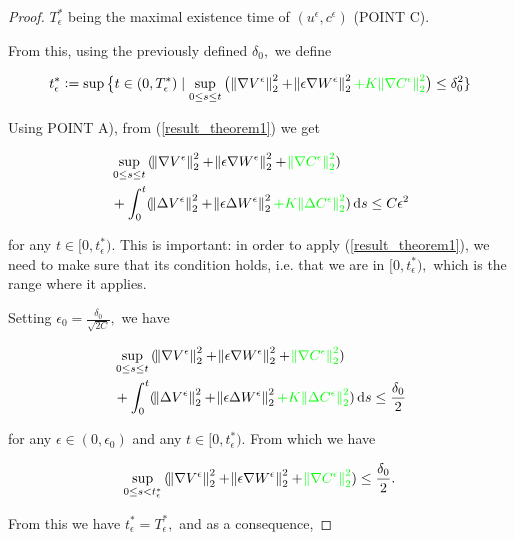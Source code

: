 \documentclass[11pt]{article}
\newcommand*\diff{\mathop{}\!\mathrm{d}}
\begin{document}
\begin{proof}
$T^*_\epsilon$ being the maximal existence time of $(u^\epsilon, c^\epsilon)$ (POINT C).

From this, using the previously defined $\delta_0,$ we define

$$t^*_\epsilon:= \sup{ \big \{ t \in (0, T^*_\epsilon) \mid \sup_{0 \leq s \leq t}{\big (\norm{\nabla V^\epsilon}^2_2 + \norm{\epsilon \nabla W^\epsilon}^2_2 \textcolor{green}{+ K \norm{\nabla C^\epsilon}^2_2} \big ) \leq \delta_0^2}\} }$$

Using POINT A), from (\ref{result_theorem1}) we get

\begin{equation}
  \begin{split}
    & \sup_{0 \leq s \leq t}{(\norm{\nabla V^\epsilon}^2_2 + \norm{\epsilon \nabla W^\epsilon}^2_2 + \textcolor{green}{\norm{\nabla C^\epsilon}^2_2}) } \\
    & + \int_0^t (\norm{\Delta V^\epsilon}^2_2 + \norm{\epsilon \Delta W^\epsilon}^2_2 \textcolor{green}{+ K \norm{\Delta C^\epsilon}^2_2}) \diff s \leq C \epsilon^2
  \end{split}
\end{equation}

for any $t \in [0, t^*_\epsilon).$ This is important: in order to apply (\ref{result_theorem1}), we need to make sure that its condition holds, i.e. that we are in $[0, t^*_\epsilon),$ which is the range where it applies.

Setting $\epsilon_0 = \frac{\delta_0}{\sqrt{2C}},$ we have

\begin{equation}
  \begin{split}
    & \sup_{0 \leq s \leq t}{(\norm{\nabla V^\epsilon}^2_2 + \norm{\epsilon \nabla W^\epsilon}^2_2 + \textcolor{green}{\norm{\nabla C^\epsilon}^2_2}) } \\
    & + \int_0^t (\norm{\Delta V^\epsilon}^2_2 + \norm{\epsilon \Delta W^\epsilon}^2_2 \textcolor{green}{+ K \norm{\Delta C^\epsilon}^2_2}) \diff s \leq \frac{\delta_0}{2}
  \end{split}
\end{equation}

for any $\epsilon \in (0, \epsilon_0)$ and any $t \in [0, t^*_\epsilon).$ From which we have

$$ \sup_{0 \leq s < t^*_\epsilon}{(\norm{\nabla V^\epsilon}^2_2 + \norm{\epsilon \nabla W^\epsilon}^2_2 + \textcolor{green}{\norm{\nabla C^\epsilon}^2_2}) } \leq \frac{\delta_0}{2}.$$

From this we have $t^*_\epsilon = T^*_\epsilon,$ and as a consequence,


\end{proof}
\end{document}
